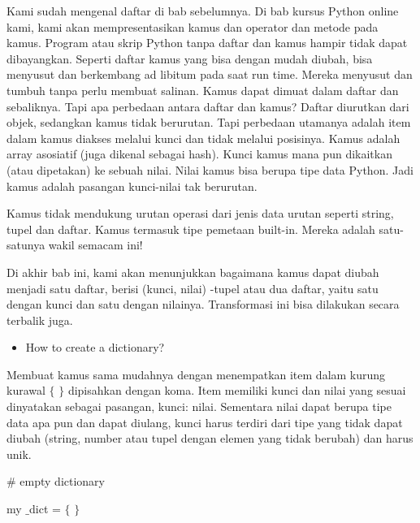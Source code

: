 Kami sudah mengenal daftar di bab sebelumnya. Di bab kursus Python online kami, kami akan mempresentasikan kamus dan operator dan metode pada kamus. Program atau skrip Python tanpa daftar dan kamus hampir tidak dapat dibayangkan. Seperti daftar kamus yang bisa dengan mudah diubah, bisa menyusut dan berkembang ad libitum pada saat run time. Mereka menyusut dan tumbuh tanpa perlu membuat salinan. Kamus dapat dimuat dalam daftar dan sebaliknya. Tapi apa perbedaan antara daftar dan kamus? Daftar diurutkan dari objek, sedangkan kamus tidak berurutan. Tapi perbedaan utamanya adalah item dalam kamus diakses melalui kunci dan tidak melalui posisinya. Kamus adalah array asosiatif (juga dikenal sebagai hash). Kunci kamus mana pun dikaitkan (atau dipetakan) ke sebuah nilai. Nilai kamus bisa berupa tipe data Python. Jadi kamus adalah pasangan kunci-nilai tak berurutan. \par
\vspace{12pt}
\noindent 
Kamus tidak mendukung urutan operasi dari jenis data urutan seperti string, tupel dan daftar. Kamus termasuk tipe pemetaan built-in. Mereka adalah satu-satunya wakil semacam ini! \par
\vspace{12pt}
\noindent 
Di akhir bab ini, kami akan menunjukkan bagaimana kamus dapat diubah menjadi satu daftar, berisi (kunci, nilai) -tupel atau dua daftar, yaitu satu dengan kunci dan satu dengan nilainya. Transformasi ini bisa dilakukan secara terbalik juga. \par
\vspace{12pt}
\noindent 
\begin{itemize}
	\item How to create a dictionary?
\end{itemize}
Membuat kamus sama mudahnya dengan menempatkan item dalam kurung kurawal  $  \{  $ $  \}  $ dipisahkan dengan koma. Item memiliki kunci dan nilai yang sesuai dinyatakan sebagai pasangan, kunci: nilai. Sementara nilai dapat berupa tipe data apa pun dan dapat diulang, kunci harus terdiri dari tipe yang tidak dapat diubah (string, number atau tupel dengan elemen yang tidak berubah) dan harus unik. \par
\noindent 
 \hspace*{0.5in}  $  \#  $ empty dictionary \par
\noindent 
 \hspace*{0.5in} my $  \_  $dict =  $  \{  $ $  \}  $ \par
\vspace{12pt}
\noindent 
